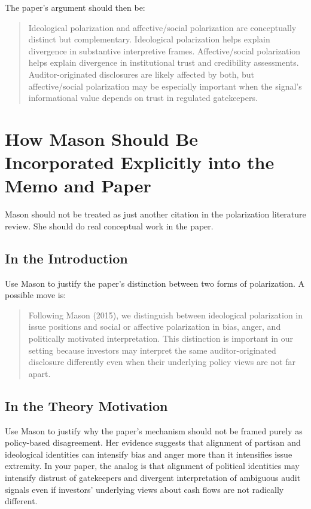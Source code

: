 \documentclass[12pt]{article}
\begin{document}
The paper's argument should then be:

\begin{quote}
Ideological polarization and affective/social polarization are conceptually distinct but complementary. Ideological polarization helps explain divergence in substantive interpretive frames. Affective/social polarization helps explain divergence in institutional trust and credibility assessments. Auditor-originated disclosures are likely affected by both, but affective/social polarization may be especially important when the signal's informational value depends on trust in regulated gatekeepers.
\end{quote}

\section{How Mason Should Be Incorporated Explicitly into the Memo and Paper}

Mason should not be treated as just another citation in the polarization literature review. She should do real conceptual work in the paper.

\subsection{In the Introduction}

Use Mason to justify the paper's distinction between two forms of polarization. A possible move is:

\begin{quote}
Following Mason (2015), we distinguish between ideological polarization in issue positions and social or affective polarization in bias, anger, and politically motivated interpretation. This distinction is important in our setting because investors may interpret the same auditor-originated disclosure differently even when their underlying policy views are not far apart.
\end{quote}

\subsection{In the Theory Motivation}

Use Mason to justify why the paper's mechanism should not be framed purely as policy-based disagreement. Her evidence suggests that alignment of partisan and ideological identities can intensify bias and anger more than it intensifies issue extremity. In your paper, the analog is that alignment of political identities may intensify distrust of gatekeepers and divergent interpretation of ambiguous audit signals even if investors' underlying views about cash flows are not radically different.
\end{document}
